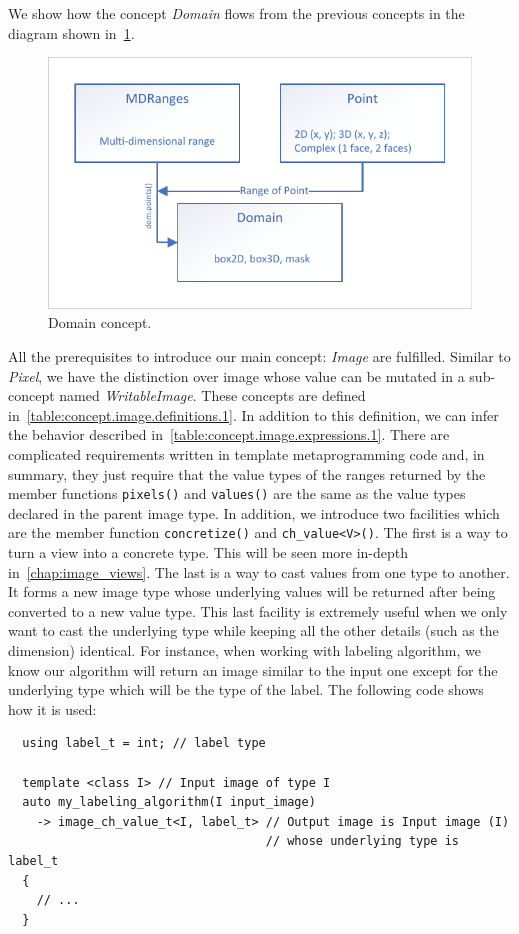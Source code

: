 We show how the concept \emph{Domain} flows from the previous concepts in the diagram shown in~\cref{fig:concept.domain}.

\begin{figure}[htbp]
  \centering
  \includegraphics[width=.8\linewidth]{../figures/concepts/domain}
  \caption{Domain concept.}
  \label{fig:concept.domain}
\end{figure}

All the prerequisites to introduce our main concept: \emph{Image} are fulfilled. Similar to \emph{Pixel}, we have the
distinction over image whose value can be mutated in a sub-concept named \emph{WritableImage}. These concepts are
defined in~\cref{table:concept.image.definitions.1}. In addition to this definition, we can infer the behavior described
in~\cref{table:concept.image.expressions.1}. There are complicated requirements written in template metaprogramming code
and, in summary, they just require that the value types of the ranges returned by the member functions \texttt{pixels()}
and \texttt{values()} are the same as the value types declared in the parent image type. In addition, we introduce two
facilities which are the member function \texttt{concretize()} and \texttt{ch\_value<V>()}. The first is a way to turn a
view into a concrete type. This will be seen more in-depth in~\cref{chap:image_views}. The last is a way to cast values
from one type to another. It forms a new image type whose underlying values will be returned after being converted to a
new value type. This last facility is extremely useful when we only want to cast the underlying type while keeping all
the other details (such as the dimension) identical. For instance, when working with labeling algorithm, we know our
algorithm will return an image similar to the input one except for the underlying type which will be the type of the
label. The following code shows how it is used:
\begin{verbatim}
  using label_t = int; // label type

  template <class I> // Input image of type I
  auto my_labeling_algorithm(I input_image)
    -> image_ch_value_t<I, label_t> // Output image is Input image (I)
                                    // whose underlying type is label_t
  {
    // ...
  }
\end{verbatim}

